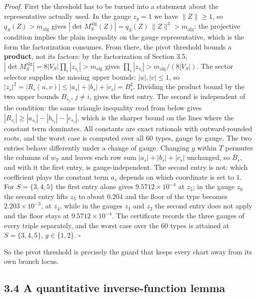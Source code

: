 \emph{Proof.} First the threshold has to be turned into a statement about the representative actually used. In the gauge \(z_g = 1\) we have \(\lVert Z \rVert \ge 1\), so \(q_S(Z) > m_{\mathrm{alg}}\) gives \(|\det M_S^{\mathrm{alg}}(Z)| = q_S(Z)\,\lVert Z \rVert^3 > m_{\mathrm{alg}}\): the projective condition implies the plain inequality on the gauge representative, which is the form the factorization consumes. From there, the pivot threshold bounds a \textbf{product}, not its factors: by the factorization of Section 3.5, \(|\det M_S^{\mathrm{alg}}| = 8|V_S| \prod_i |z_{s_i}| > m_{\mathrm{alg}}\) gives \(\prod_i |z_{s_i}| > m_{\mathrm{alg}} / (8|V_S|)\). The sector selector supplies the missing upper bounds: \(|u|, |v| \le 1\), so \(|z_s|^2 = |R_s(u,v)| \le |a_s| + |b_s| + |c_s| = B_s^2\). Dividing the product bound by the two upper bounds \(B_{s_j}\), \(j \neq i\), gives the first entry. The second is independent of the condition: the same triangle inequality read from below gives \(|R_{s_i}| \ge |a_{s_i}| - |b_{s_i}| - |c_{s_i}|\), which is the sharper bound on the lines where the constant term dominates. All constants are exact rationals with outward-rounded roots, and the worst case is computed over all \(60\) types, gauge by gauge. The two entries behave differently under a change of gauge. Changing \(g\) within \(T\) permutes the columns of \(w_T\) and leaves each row sum \(|a_s| + |b_s| + |c_s|\) unchanged, so \(B_s\), and with it the first entry, is gauge-independent. The second entry is not: which coefficient plays the constant term \(a_s\) depends on which coordinate is set to \(1\). For \(S = \{3,4,5\}\) the first entry alone gives \(9.5712 \times 10^{-4}\) at \(z_5\); in the gauge \(z_0\) the second entry lifts \(z_5\) to about \(0.204\) and the floor of the type becomes \(2.203 \times 10^{-3}\), at \(z_4\), while in the gauges \(z_1\) and \(z_2\) the second entry does not apply and the floor stays at \(9.5712 \times 10^{-4}\). The certificate records the three gauges of every triple separately, and the worst case over the \(60\) types is attained at \(S = \{3,4,5\}\), \(g \in \{1, 2\}\). \(\square\)

So the pivot threshold is precisely the guard that keeps every chart away from its own branch locus.

\subsection{3.4 A quantitative inverse-function lemma}\label{a-quantitative-inverse-function-lemma}

